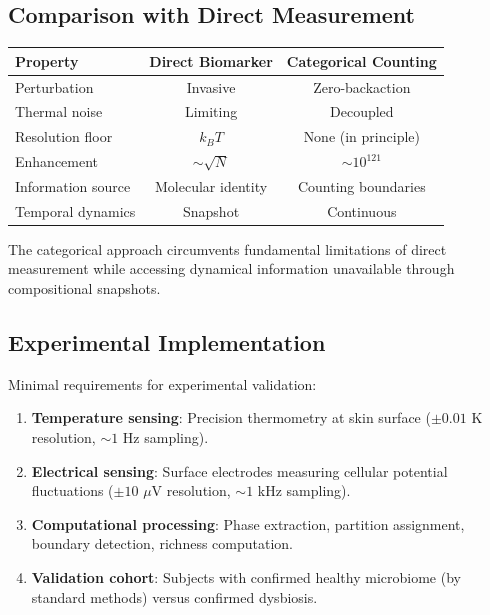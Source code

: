 \documentclass[twocolumn,10pt]{article}
\begin{document}
\subsection{Comparison with Direct Measurement}

\begin{center}
\begin{tabular}{lcc}
\toprule
Property & Direct Biomarker & Categorical Counting \\
\midrule
Perturbation & Invasive & Zero-backaction \\
Thermal noise & Limiting & Decoupled \\
Resolution floor & $k_B T$ & None (in principle) \\
Enhancement & $\sim \sqrt{N}$ & $\sim 10^{121}$ \\
Information source & Molecular identity & Counting boundaries \\
Temporal dynamics & Snapshot & Continuous \\
\bottomrule
\end{tabular}
\end{center}

The categorical approach circumvents fundamental limitations of direct measurement while accessing dynamical information unavailable through compositional snapshots.

\subsection{Experimental Implementation}

Minimal requirements for experimental validation:

\begin{enumerate}
    \item \textbf{Temperature sensing}: Precision thermometry at skin surface ($\pm 0.01$ K resolution, $\sim 1$ Hz sampling).

    \item \textbf{Electrical sensing}: Surface electrodes measuring cellular potential fluctuations ($\pm 10$ $\mu$V resolution, $\sim 1$ kHz sampling).

    \item \textbf{Computational processing}: Phase extraction, partition assignment, boundary detection, richness computation.

    \item \textbf{Validation cohort}: Subjects with confirmed healthy microbiome (by standard methods) versus confirmed dysbiosis.
\end{enumerate}
\end{document}
